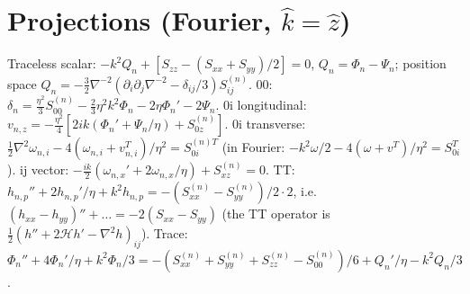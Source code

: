\section*{Projections (Fourier, $\hat k = \hat z$)}
Traceless scalar: $-k^2 Q_n + [S_{zz} - (S_{xx}+S_{yy})/2] = 0$, $Q_n = \Phi_n - \Psi_n$; position space
$Q_n = -\tfrac32 \nabla^{-2}(\partial_i\partial_j\nabla^{-2} - \delta_{ij}/3) S^{(n)}_{ij}$.
00: $\delta_n = \tfrac{\eta^2}{3} S^{(n)}_{00} - \tfrac23\eta^2 k^2\Phi_n - 2\eta\Phi_n' - 2\Psi_n$.
0i longitudinal: $v_{n,z} = -\tfrac{\eta^2}{4}[2ik(\Phi_n' + \Psi_n/\eta) + S^{(n)}_{0z}]$.
0i transverse: $\tfrac12\nabla^2\omega_{n,i} - 4(\omega_{n,i} + v^T_{n,i})/\eta^2 = S^{(n)T}_{0i}$ (in Fourier: $-k^2\omega/2 - 4(\omega+v^T)/\eta^2 = S^T_{0i}$).
ij vector: $-\tfrac{ik}{2}(\omega_{n,x}' + 2\omega_{n,x}/\eta) + S^{(n)}_{xz} = 0$.
TT: $h_{n,p}'' + 2h_{n,p}'/\eta + k^2 h_{n,p} = -(S^{(n)}_{xx}-S^{(n)}_{yy})/2 \cdot 2$, i.e. $(h_{xx}-h_{yy})'' + \dots = -2(S_{xx}-S_{yy})$ (the TT operator is $\tfrac12(h''+2\mathcal H h' - \nabla^2 h)_{ij}$).
Trace: $\Phi_n'' + 4\Phi_n'/\eta + k^2\Phi_n/3 = -(S^{(n)}_{xx}+S^{(n)}_{yy}+S^{(n)}_{zz} - S^{(n)}_{00})/6 + Q_n'/\eta - k^2 Q_n/3$.
